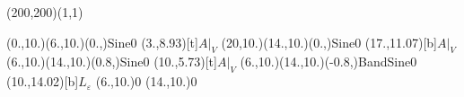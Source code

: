 \unitlength=1bp%

\begin{feynartspicture}(200,200)(1,1)

\FADiagram{}
\FAProp(0.,10.)(6.,10.)(0.,){Sine}{0}
\FALabel(3.,8.93)[t]{$A|_V$}
\FAProp(20,10.)(14.,10.)(0.,){Sine}{0}
\FALabel(17.,11.07)[b]{$A|_V$}
\FAProp(6.,10.)(14.,10.)(0.8,){Sine}{0}
\FALabel(10.,5.73)[t]{$A|_V$}
\FAProp(6.,10.)(14.,10.)(-0.8,){BandSine}{0}
\FALabel(10.,14.02)[b]{$L_\varepsilon$}
\FAVert(6.,10.){0}
\FAVert(14.,10.){0}
\end{feynartspicture}

